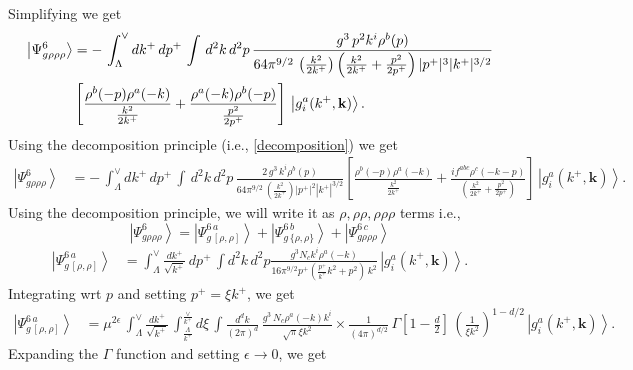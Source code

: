 \documentclass[aps,prd,amsmath,amssymb,nofootinbib]{revtex4-2}
\numberwithin{equation}{section}
\begin{document}
Simplifying we get
\begin{align}
    \left|\Psi_{g\rho\rho\rho}^{6}\right\rangle & = -\, \int_{\Lambda}^{\vee} dk^{+}\, dp^{+}\, \int\, d^{2}k\, d^{2}p\, \frac{g^{3}\, p^{2}k^{i}\rho^{b}(p)}{64\pi^{9/2}\,\left(\frac{k^{2}}{2k^{+}}\right)\left(\frac{k^{2}}{2k^{+}}+\frac{p^{2}}{2p^{+}}\right)|p^{+}|^{3} |k^{+}|^{3/2}}\notag \\ & \left[\frac{\rho^{b}(-p)\rho^{a}(-k)}{\frac{k^{2}}{2k^{+}}} + \frac{\rho^{a}(-k)\rho^{b}(-p)}{\frac{p^{2}}{2p^{+}}}\right]\, \left|g_{i}^{a}(k^{+},\mathbf{k})\right\rangle.
\end{align}
Using the decomposition principle (i.e., \eqref{decomposition}) we get
\begin{align}
    \left|\Psi_{g\rho\rho\rho}^{6}\right\rangle & = -\, \int_{\Lambda}^{\vee} dk^{+}\, dp^{+}\, \int\, d^{2}k\, d^{2}p\, \frac{2\,g^{3}\, k^{i}\rho^{b}(p)}{64\pi^{9/2}\,\left(\frac{k^{2}}{2k^{+}}\right)|p^{+}|^{2} |k^{+}|^{3/2}} \left[\frac{\rho^{b}(-p)\rho^{a}(-k)}{\frac{k^{2}}{2k^{+}}} + \frac{if^{abc}\rho^{c}(-k-p)}{{\left(\frac{k^{2}}{2k^{+}}+\frac{p^{2}}{2p^{+}}\right)}}\right]\, \left|g_{i}^{a}(k^{+},\mathbf{k})\right\rangle.
\end{align}
Using the decomposition principle, we will write it as $\rho, \rho\rho, \rho\rho\rho$ terms i.e.,
$$ \left|\Psi_{g\rho\rho\rho}^{6}\right\rangle = \left|\Psi_{g\,[\rho,\rho]}^{6\, a}\right\rangle + \left|\Psi_{g\,\{\rho,\rho\}}^{6\, b}\right\rangle +  \left|\Psi_{g\rho\rho\rho}^{6\, c}\right\rangle   $$
\begin{align}
\left|\Psi_{g\,[\rho,\rho]}^{6\, a}\right\rangle & = \int_{\Lambda}^{\vee} \frac{dk^{+}}{\sqrt{k^{+}}}\, dp^{+}\, \int d^{2}k \, d^{2}p \frac{g^{3}N_{c}k^{i}\rho^{a}(-k)}{16\pi^{9/2}p^{+}\left(\frac{p^{+}}{k^{+}}k^{2}+p^{2}\right)\,k^{2}}\, \left|g_{i}^{a}(k^{+},\mathbf{k})\right\rangle.
\end{align}
Integrating wrt $p$ and setting $p^{+} = \xi k^{+}$, we get
\begin{align}
    \left|\Psi_{g\,[\rho,\rho]}^{6\, a}\right\rangle & = \mu^{2\epsilon}\,\int_{\Lambda}^{\vee} \frac{dk^{+}}{\sqrt{k^{+}}}\,\int_{\frac{\Lambda}{k^{+}}}^{\frac{\vee}{k^{+}}} d\xi\, \int \frac{d^{d}k}{(2\pi)^{d}} \, \frac{g^{3}\,N_{c}\rho^{a}(-k)k^{i}}{\sqrt{\pi}\xi k^{2}} \times \frac{1}{(4\pi)^{d/2}}\,\Gamma\left[1-\frac{d}{2}\right]\, \left(\frac{1}{\xi k^{2}}\right)^{1-d/2}\, \left|g_{i}^{a}(k^{+},\mathbf{k})\right\rangle.
\end{align}
Expanding the $\Gamma$ function and setting $\epsilon \rightarrow 0$, we get
\end{document}
